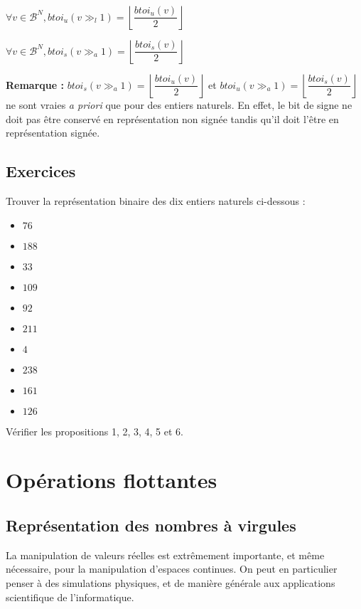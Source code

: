 \documentclass[../../main.tex]{subfiles}
\begin{document}
\proposition{} $\forall{v\in{\mathcal{B}^{N}}}, btoi_{u}(v\gg_{l}1) = \left\lfloor\dfrac{btoi_{u}(v)}{2}\right\rfloor$

\proposition{} $\forall{v\in{\mathcal{B}^{N}}}, btoi_{s}(v\gg_{a}1) = \left\lfloor\dfrac{btoi_{s}(v)}{2}\right\rfloor$

\textbf{Remarque :} $btoi_{s}(v\gg_{a}1) = \left\lfloor\dfrac{btoi_{u}(v)}{2}\right\rfloor$ et $btoi_{u}(v\gg_{a}1) = \left\lfloor\dfrac{btoi_{s}(v)}{2}\right\rfloor$ ne sont vraies \textit{a priori} que pour des entiers naturels. En effet, le bit de signe ne doit pas être conservé en représentation non signée tandis qu'il doit l'être en représentation signée.
\subsection{Exercices}
\newline
Trouver la représentation binaire des dix entiers naturels ci-dessous :

\begin{minipage}{0.5\textwidth}
\begin{itemize}
     \item $76$
     \item $188$
     \item $33$
     \item $109$
     \item $92$
\end{itemize}
\end{minipage}
\begin{minipage}{0.5\textwidth}
\begin{itemize}
     \item $211$
     \item $4$
     \item $238$
     \item $161$
     \item $126$
\end{itemize}
\end{minipage}

Vérifier les propositions 1, 2, 3, 4, 5 et 6.

\section{Opérations flottantes} \label{sec:op_rations_flottantes}
\subsection{Représentation des nombres à virgules}
\label{sub:repr_sentation_des_nombres_virgules}
La manipulation de valeurs réelles est extrêmement importante, et même nécessaire, pour la manipulation d'espaces continues. On peut en particulier penser à des simulations physiques, et de manière générale aux applications scientifique de l'informatique.
\end{document}
